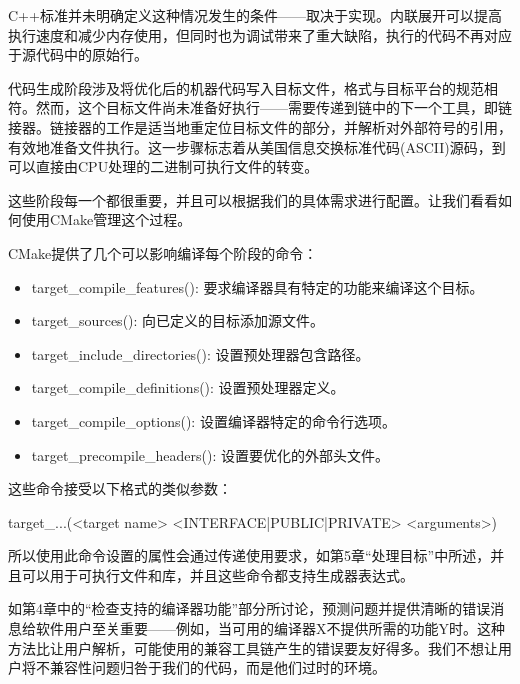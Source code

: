 C++标准并未明确定义这种情况发生的条件——取决于实现。内联展开可以提高执行速度和减少内存使用，但同时也为调试带来了重大缺陷，执行的代码不再对应于源代码中的原始行。

代码生成阶段涉及将优化后的机器代码写入目标文件，格式与目标平台的规范相符。然而，这个目标文件尚未准备好执行——需要传递到链中的下一个工具，即链接器。链接器的工作是适当地重定位目标文件的部分，并解析对外部符号的引用，有效地准备文件执行。这一步骤标志着从美国信息交换标准代码(ASCII)源码，到可以直接由CPU处理的二进制可执行文件的转变。

这些阶段每一个都很重要，并且可以根据我们的具体需求进行配置。让我们看看如何使用CMake管理这个过程。


CMake提供了几个可以影响编译每个阶段的命令：

\begin{itemize}
\item
target\_compile\_features(): 要求编译器具有特定的功能来编译这个目标。

\item
target\_sources(): 向已定义的目标添加源文件。

\item
target\_include\_directories(): 设置预处理器包含路径。

\item
target\_compile\_definitions(): 设置预处理器定义。

\item
target\_compile\_options(): 设置编译器特定的命令行选项。

\item
target\_precompile\_headers(): 设置要优化的外部头文件。
\end{itemize}

这些命令接受以下格式的类似参数：

\begin{shell}
target_...(<target name> <INTERFACE|PUBLIC|PRIVATE> <arguments>)
\end{shell}

所以使用此命令设置的属性会通过传递使用要求，如第5章“处理目标”中所述，并且可以用于可执行文件和库，并且这些命令都支持生成器表达式。


如第4章中的“检查支持的编译器功能”部分所讨论，预测问题并提供清晰的错误消息给软件用户至关重要——例如，当可用的编译器X不提供所需的功能Y时。这种方法比让用户解析，可能使用的兼容工具链产生的错误要友好得多。我们不想让用户将不兼容性问题归咎于我们的代码，而是他们过时的环境。

